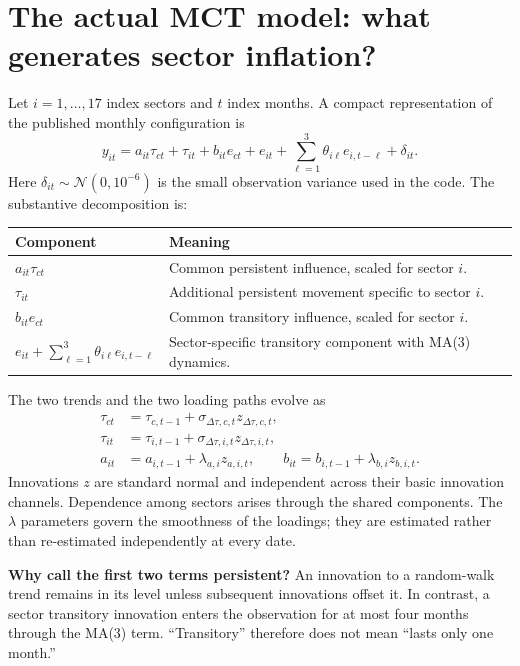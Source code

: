 \documentclass[11pt,a4paper]{article}
\newcommand{\N}{\mathcal N}
\begin{document}
\section{The actual MCT model: what generates sector inflation?}
Let $i=1,\ldots,17$ index sectors and $t$ index months. A compact representation of the published monthly configuration is
\begin{equation}
y_{it}=a_{it}\tau_{ct}+\tau_{it}+b_{it}e_{ct}
       +e_{it}+\sum_{\ell=1}^{3}\theta_{i\ell}e_{i,t-\ell}+\delta_{it}.
\label{eq:mct}
\end{equation}
Here $\delta_{it}\sim\N(0,10^{-6})$ is the small observation variance used in the code. The substantive decomposition is:
\begin{center}
\begin{tabular}{p{.35\linewidth}p{.54\linewidth}}
\toprule
Component & Meaning\\\midrule
$a_{it}\tau_{ct}$ & Common persistent influence, scaled for sector $i$.\\
$\tau_{it}$ & Additional persistent movement specific to sector $i$.\\
$b_{it}e_{ct}$ & Common transitory influence, scaled for sector $i$.\\
$e_{it}+\sum_{\ell=1}^{3}\theta_{i\ell}e_{i,t-\ell}$ & Sector-specific transitory component with MA(3) dynamics.\\\bottomrule
\end{tabular}
\end{center}
The two trends and the two loading paths evolve as
\begin{align}
\tau_{ct}&=\tau_{c,t-1}+\sigma_{\Delta\tau,c,t}z_{\Delta\tau,c,t},\\
\tau_{it}&=\tau_{i,t-1}+\sigma_{\Delta\tau,i,t}z_{\Delta\tau,i,t},\\
a_{it}&=a_{i,t-1}+\lambda_{a,i}z_{a,i,t},\qquad
b_{it}=b_{i,t-1}+\lambda_{b,i}z_{b,i,t}.
\end{align}
Innovations $z$ are standard normal and independent across their basic innovation channels. Dependence among sectors arises through the shared components. The $\lambda$ parameters govern the smoothness of the loadings; they are estimated rather than re-estimated independently at every date.

\textbf{Why call the first two terms persistent?} An innovation to a random-walk trend remains in its level unless subsequent innovations offset it. In contrast, a sector transitory innovation enters the observation for at most four months through the MA(3) term. ``Transitory'' therefore does not mean ``lasts only one month.''
\end{document}
